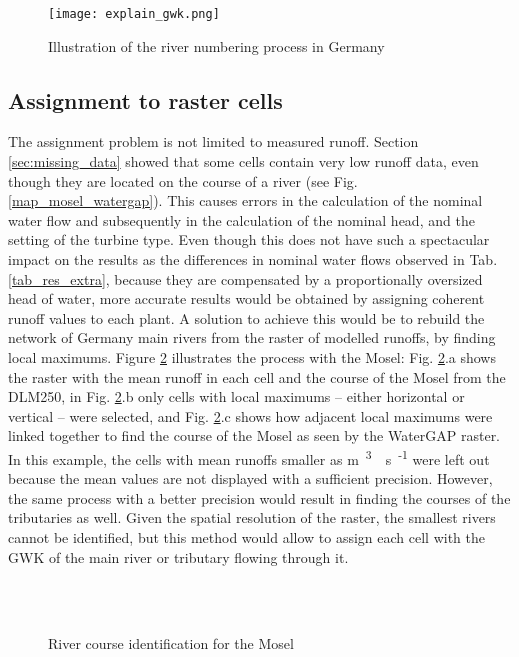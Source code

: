 \begin{figure}[H]
\centering
\texttt{[image: explain\_gwk.png]}
\caption{Illustration of the river numbering process in Germany}
\label{explain_gwk}
\end{figure}

\subsection{Assignment to raster cells}
\label{sub:imp_assign_cell}
The assignment problem is not limited to measured runoff. Section \ref{sec:missing_data} showed that some cells contain very low runoff data, even though they are located on the course of a river (see Fig. \ref{map_mosel_watergap}). This causes errors in the calculation of the nominal water flow and subsequently in the calculation of the nominal head, and the setting of the turbine type. Even though this does not have such a spectacular impact on the results as the differences in nominal water flows observed in Tab. \ref{tab_res_extra}, because they are compensated by a proportionally oversized head of water, more accurate results would be obtained by assigning coherent runoff values to each plant. \newline
A solution to achieve this would be to rebuild the network of Germany main rivers from the raster of modelled runoffs, by finding local maximums. Figure \ref{imp_mosel} illustrates the process with the Mosel: Fig. \ref{imp_mosel}.a shows the raster with the mean runoff in each cell and the course of the Mosel from the DLM250, in Fig. \ref{imp_mosel}.b only cells with local maximums -- either horizontal or vertical -- were selected, and Fig. \ref{imp_mosel}.c shows how adjacent local maximums were linked together to find the course of the Mosel as seen by the WaterGAP raster. \newline
In this example, the cells with mean runoffs smaller as \unit[1]{m\textsuperscript{3}\textperiodcentered s\textsuperscript{-1}} were left out because the mean values are not displayed with a sufficient precision. However, the same process with a better precision would result in finding the courses of the tributaries as well. Given the spatial resolution of the raster, the smallest rivers cannot be identified, but this method would allow to assign each cell with the GWK of the main river or tributary flowing through it.

\begin{figure}[H]
\begin{center}
   \\
   \\
\end{center}
\caption{River course identification for the Mosel}
\label{imp_mosel}
\end{figure}

